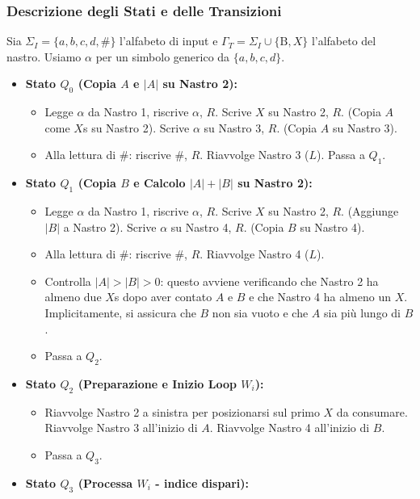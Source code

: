 \documentclass[a4paper, 11pt]{book} %
\theoremstyle{definition}
\newcommand{\B}{\text{B}} %
\begin{document}
\subsubsection{Descrizione degli Stati e delle Transizioni}
Sia $\Sigma_I = \{a,b,c,d,\#\}$ l'alfabeto di input e $\Gamma_T = \Sigma_I \cup \{\B, X\}$ l'alfabeto del nastro. Usiamo $\alpha$ per un simbolo generico da $\{a,b,c,d\}$.

\begin{itemize}
    \item \textbf{Stato $Q_0$ (Copia $A$ e $|A|$ su Nastro 2):}
        \begin{itemize}
            \item Legge $\alpha$ da Nastro 1, riscrive $\alpha$, $R$. Scrive $X$ su Nastro 2, $R$. (Copia $A$ come $X$s su Nastro 2). Scrive $\alpha$ su Nastro 3, $R$. (Copia $A$ su Nastro 3).
            \item Alla lettura di $\#$: riscrive $\#$, $R$. Riavvolge Nastro 3 ($L$). Passa a $Q_1$.
        \end{itemize}
    \item \textbf{Stato $Q_1$ (Copia $B$ e Calcolo $|A|+|B|$ su Nastro 2):}
        \begin{itemize}
            \item Legge $\alpha$ da Nastro 1, riscrive $\alpha$, $R$. Scrive $X$ su Nastro 2, $R$. (Aggiunge $|B|$ a Nastro 2). Scrive $\alpha$ su Nastro 4, $R$. (Copia $B$ su Nastro 4).
            \item Alla lettura di $\#$: riscrive $\#$, $R$. Riavvolge Nastro 4 ($L$).
            \item Controlla $|A|>|B|>0$: questo avviene verificando che Nastro 2 ha almeno due $X$s dopo aver contato $A$ e $B$ e che Nastro 4 ha almeno un $X$. Implicitamente, si assicura che $B$ non sia vuoto e che $A$ sia più lungo di $B$.
            \item Passa a $Q_2$.
        \end{itemize}
    \item \textbf{Stato $Q_2$ (Preparazione e Inizio Loop $W_i$):}
        \begin{itemize}
            \item Riavvolge Nastro 2 a sinistra per posizionarsi sul primo $X$ da consumare. Riavvolge Nastro 3 all'inizio di $A$. Riavvolge Nastro 4 all'inizio di $B$.
            \item Passa a $Q_3$.
        \end{itemize}
    \item \textbf{Stato $Q_3$ (Processa $W_i$ - indice dispari):}

\end{itemize}
\end{document}
